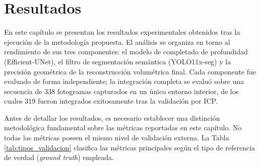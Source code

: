 \documentclass[12pt, a4, twoside, openany]{report}
\begin{document}
\chapter{Resultados}

En este capítulo se presentan los resultados experimentales obtenidos tras la ejecución de la metodología propuesta. El análisis se organiza en torno al rendimiento de sus tres componentes: el modelo de completado de profundidad (Efficient-UNet), el filtro de segmentación semántica (YOLO11x-seg) y la precisión geométrica de la reconstrucción volumétrica final. Cada componente fue evaluado de forma independiente; la integración completa se evaluó sobre una secuencia de 338 fotogramas capturados en un único entorno interior, de los cuales 319 fueron integrados exitosamente tras la validación por ICP.

Antes de detallar los resultados, es necesario establecer una distinción metodológica fundamental sobre las métricas reportadas en este capítulo. No todas las métricas poseen el mismo nivel de validación externa. La Tabla \ref{tab:tipos_validacion} clasifica las métricas principales según el tipo de referencia de verdad (\textit{ground truth}) empleada.

\begin{table}[H]
\centering
\caption{Clasificación de Métricas por Tipo de Validación}
\label{tab:tipos_validacion}
\end{table}
\end{document}
